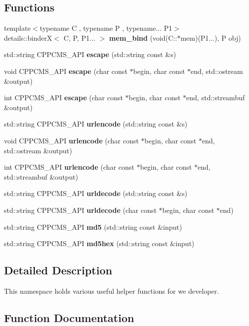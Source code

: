 \subsection*{Functions}
\begin{DoxyCompactItemize}
\item 
{\footnotesize template$<$typename C , typename P , typename... P1$>$ }\\details\+::binderX$<$ C, P, P1... $>$ {\bf mem\+\_\+bind} (void(C\+::$\ast$mem)(P1...), P obj)
\item 
std\+::string C\+P\+P\+C\+M\+S\+\_\+\+A\+PI {\bf escape} (std\+::string const \&s)
\item 
void C\+P\+P\+C\+M\+S\+\_\+\+A\+PI {\bf escape} (char const $\ast$begin, char const $\ast$end, std\+::ostream \&output)
\item 
int C\+P\+P\+C\+M\+S\+\_\+\+A\+PI {\bf escape} (char const $\ast$begin, char const $\ast$end, std\+::streambuf \&output)
\item 
std\+::string C\+P\+P\+C\+M\+S\+\_\+\+A\+PI {\bf urlencode} (std\+::string const \&s)
\item 
void C\+P\+P\+C\+M\+S\+\_\+\+A\+PI {\bf urlencode} (char const $\ast$begin, char const $\ast$end, std\+::ostream \&output)
\item 
int C\+P\+P\+C\+M\+S\+\_\+\+A\+PI {\bf urlencode} (char const $\ast$begin, char const $\ast$end, std\+::streambuf \&output)
\item 
std\+::string C\+P\+P\+C\+M\+S\+\_\+\+A\+PI {\bf urldecode} (std\+::string const \&s)
\item 
std\+::string C\+P\+P\+C\+M\+S\+\_\+\+A\+PI {\bf urldecode} (char const $\ast$begin, char const $\ast$end)
\item 
std\+::string C\+P\+P\+C\+M\+S\+\_\+\+A\+PI {\bf md5} (std\+::string const \&input)
\item 
std\+::string C\+P\+P\+C\+M\+S\+\_\+\+A\+PI {\bf md5hex} (std\+::string const \&input)
\end{DoxyCompactItemize}


\subsection{Detailed Description}
This namespace holds various useful helper functions for we developer. 

\subsection{Function Documentation}
